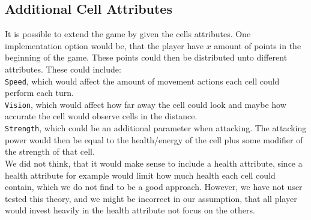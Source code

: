 \subsection{Additional Cell Attributes}
It is possible to extend the game by given the cells attributes. One implementation option would be, that the player have $x$ amount of points in the beginning of the game. These points could then be distributed unto different attributes. These could include:\\

\verb|Speed|, which would affect the amount of movement actions each cell could perform each turn.\\
\verb|Vision|, which would affect how far away the cell could look and maybe how accurate the cell would observe cells in the distance.\\
\verb|Strength|, which could be an additional parameter when attacking. The attacking power would then be equal to the health/energy of the cell plus some modifier of the strength of that cell.\\

We did not think, that it would make sense to include a health attribute, since a health attribute for example would limit how much health each cell could contain, which we do not find to be a good approach. However, we have not user tested this theory, and we might be incorrect in our assumption, that all player would invest heavily in the health attribute not focus on the others.